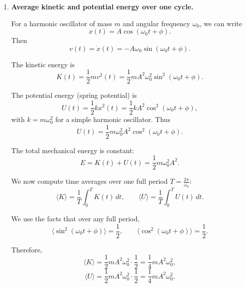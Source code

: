 \documentclass[12pt]{article}
\begin{document}
\begin{enumerate}
In words: find the next zero of the sine after $t=0$. Equivalently, if $\phi \in (-\pi,\pi]$,
\[
t_{\text{first}} =
\begin{cases}
\displaystyle \frac{-\phi}{\omega_0}, & \text{if } \phi < 0, \\[1em]
\displaystyle \frac{\pi - \phi}{\omega_0}, & \text{if } \phi \ge 0~.
\end{cases}
\]

We can also express $\phi$ in terms of $x_0,v_0$ using
\[
\phi = \arctan2\!\left(-\frac{v_0}{A\omega_0}, \frac{x_0}{A}\right),
\]
where $\arctan2(y,x)$ is the correct quadrant angle with $\cos\phi = x_0/A$ and $\sin\phi = -v_0/(A\omega_0)$.

Summary: the first time the oscillator reaches an endpoint ($|x|=A$) after $t=0$ is given by the smallest positive member of $t_n = (n\pi-\phi)/\omega_0$.

Physically: the oscillator reaches maximum displacement whenever its velocity first becomes zero.


\item \textbf{Average kinetic and potential energy over one cycle.}

For a harmonic oscillator of mass $m$ and angular frequency $\omega_0$, we can write
\[
x(t) = A \cos(\omega_0 t + \phi).
\]
Then
\[
v(t) = \dot{x}(t) = -A \omega_0 \sin(\omega_0 t + \phi).
\]

The kinetic energy is
\[
K(t) = \frac{1}{2} m v^2(t)
= \frac{1}{2} m A^2 \omega_0^2 \sin^2(\omega_0 t + \phi).
\]

The potential energy (spring potential) is
\[
U(t) = \frac{1}{2} k x^2(t)
= \frac{1}{2} k A^2 \cos^2(\omega_0 t + \phi),
\]
with $k = m \omega_0^2$ for a simple harmonic oscillator. Thus
\[
U(t) = \frac{1}{2} m \omega_0^2 A^2 \cos^2(\omega_0 t + \phi).
\]

The total mechanical energy is constant:
\[
E = K(t)+U(t)
= \frac{1}{2} m \omega_0^2 A^2.
\]

We now compute time averages over one full period $T = \frac{2\pi}{\omega_0}$:
\[
\langle K \rangle
= \frac{1}{T} \int_0^T K(t)\, dt,
\qquad
\langle U \rangle
= \frac{1}{T} \int_0^T U(t)\, dt.
\]

We use the facts that over any full period,
\[
\langle \sin^2(\omega_0 t + \phi) \rangle = \frac{1}{2},
\qquad
\langle \cos^2(\omega_0 t + \phi) \rangle = \frac{1}{2}.
\]

Therefore,
\[
\langle K \rangle
= \frac{1}{2} m A^2 \omega_0^2 \cdot \frac{1}{2}
= \frac{1}{4} m A^2 \omega_0^2,
\]
\[
\langle U \rangle
= \frac{1}{2} m A^2 \omega_0^2 \cdot \frac{1}{2}
= \frac{1}{4} m A^2 \omega_0^2.
\]


\end{enumerate}
\end{document}

